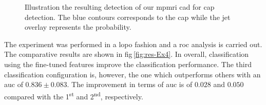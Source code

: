 \begin{figure}
  \caption[Illustration the resulting detection of our \acs*{mpmri} \acs*{cad} for \acs*{cap} detection.]{Illustration the resulting detection of our \acs*{mpmri} \acs*{cad} for \acs*{cap} detection. The blue contours corresponds to the \ac{cap} while the jet overlay represents the probability.}
  \label{fig:resultcad}
\end{figure}

The experiment was performed in a \ac{lopo} fashion and a \ac{roc} analysis is carried out.
The comparative results are shown in \acs{fig}\,\ref{fig:res-Ex4}.
In overall, classification using the fine-tuned features improve the classification performance.
The third classification configuration is, however, the one which outperforms others with an \ac{auc} of $0.836 \pm 0.083$.
The improvement in terms of \ac{auc} is of $0.028$ and $0.050$ compared with the 1\textsuperscript{st} and 2\textsuperscript{nd}, respectively.

